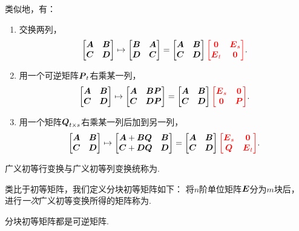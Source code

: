 类似地，有：
\begin{enumerate}
	\item 交换两列，\[
		\OriginalMatrix
		\mapsto \begin{bmatrix}
			\vb{B} & \vb{A} \\
			\vb{D} & \vb{C}
		\end{bmatrix}
		= \OriginalMatrix {\color{red} \begin{bmatrix}
			\vb0 & \vb{E}_s \\
			\vb{E}_t & \vb0
		\end{bmatrix}}.
	\]

	\item 用一个可逆矩阵\(\vb{P}_t\)右乘某一列，\[
		\OriginalMatrix
		\mapsto \begin{bmatrix}
			\vb{A} & \vb{B}\vb{P} \\
			\vb{C} & \vb{D}\vb{P}
		\end{bmatrix}
		= \OriginalMatrix {\color{red} \begin{bmatrix}
			\vb{E}_s & \vb0 \\
			\vb0 & \vb{P}
		\end{bmatrix}}.
	\]

	\item 用一个矩阵\(\vb{Q}_{t \times s}\)右乘某一列后加到另一列，\[
		\OriginalMatrix
		\mapsto \begin{bmatrix}
			\vb{A} + \vb{B}\vb{Q} & \vb{B} \\
			\vb{C} + \vb{D}\vb{Q} & \vb{D}
		\end{bmatrix}
		= \OriginalMatrix {\color{red} \begin{bmatrix}
			\vb{E}_s & \vb0 \\
			\vb{Q} & \vb{E}_t
		\end{bmatrix}}.
	\]
\end{enumerate}

广义初等行变换与广义初等列变换统称为.

类比于初等矩阵，我们定义分块初等矩阵如下：
将\(n\)阶单位矩阵\(\vb{E}\)分为\(m\)块后，
进行\emph{一次}广义初等变换所得的矩阵称为.

\begin{property}
分块初等矩阵都是可逆矩阵.
\end{property}
